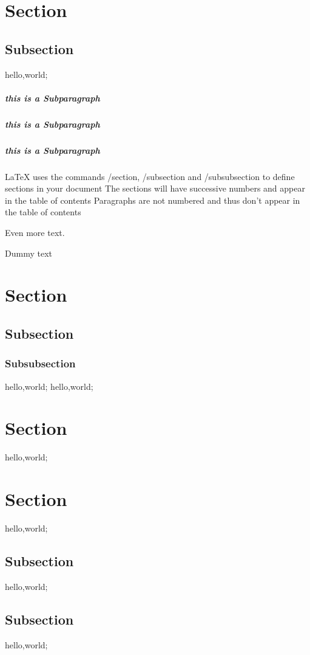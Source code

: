 \documentclass{article}
\begin{document}
    \doublespacing
    \tableofcontents

    \newpage
    
    \section{Section}
    \subsection{Subsection}
    hello,world;
    \subparagraph{this is a Subparagraph}
    \subparagraph{this is a Subparagraph}
    \subparagraph{this is a Subparagraph}
    LaTeX uses the commands \slash section, \slash subsection and \slash subsubsection to define sections in your document
    The sections will have successive numbers and appear in the table of contents
    Paragraphs are not numbered and thus don't appear in the table of contents
    
    Even more text.
    
        
    Dummy text

    \section{Section}
    \subsection{Subsection}
    \subsubsection{Subsubsection}
    hello,world;
    hello,world;
    \section{Section}
    hello,world;

    \section{Section}
    hello,world;
    
    \subsection{Subsection}
    hello,world;
    \subsection{Subsection}
    hello,world;
\end{document}
